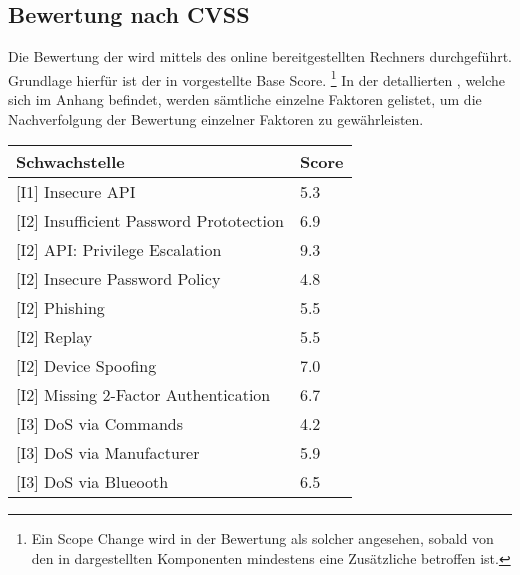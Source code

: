 \subsection{Bewertung nach CVSS}
\label{sec:analysis_cvss}
    Die Bewertung der  wird mittels des online bereitgestellten Rechners\cite{CvssCalc} durchgeführt.
	Grundlage hierfür ist der in  vorgestellte Base Score.
	\footnote{Ein Scope Change wird in der Bewertung als solcher angesehen, sobald von den in  dargestellten Komponenten mindestens eine Zusätzliche betroffen ist.}
	In der detallierten , welche sich im Anhang befindet, werden sämtliche einzelne Faktoren gelistet, um die Nachverfolgung der Bewertung einzelner Faktoren zu gewährleisten.

    \begin{table}[H]
        \centering
        \begin{tabular}{|l|l|}
        \hline
\textbf{Schwachstelle}                      & \textbf{Score} \\ \hline
\rowcolor{light-gray}
{[}I1{]} Insecure API                       & \cellcolor{orange}5.3            \\ \hline
{[}I2{]} Insufficient Password Prototection & \cellcolor{orange}6.9            \\ \hline
\rowcolor{light-gray}
{[}I2{]} API: Privilege Escalation          & \cellcolor{red}9.3            \\ \hline
{[}I2{]} Insecure Password Policy           & \cellcolor{orange}4.8            \\ \hline
\rowcolor{light-gray}
{[}I2{]} Phishing                           & \cellcolor{orange}5.5            \\ \hline
{[}I2{]} Replay                             & \cellcolor{orange}5.5            \\ \hline
\rowcolor{light-gray}
{[}I2{]} Device Spoofing                    & \cellcolor{redorange}7.0            \\ \hline
{[}I2{]} Missing 2-Factor Authentication    & \cellcolor{orange}6.7            \\ \hline
\rowcolor{light-gray}
{[}I3{]} DoS via Commands                   & \cellcolor{orange}4.2            \\ \hline
{[}I3{]} DoS via Manufacturer               & \cellcolor{orange}5.9            \\ \hline
\rowcolor{light-gray}
{[}I3{]} DoS via Blueooth                   & \cellcolor{orange}6.5            \\ \hline

\end{tabular}
\end{table}
